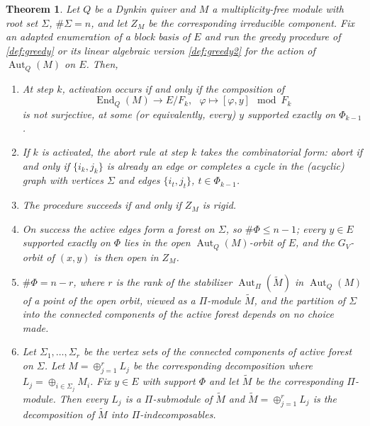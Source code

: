 \documentclass[12pt]{article}
\newtheorem{theorem}{Theorem}[section]
\newcommand{\End}{\operatorname{End}}
\newcommand{\Aut}{\operatorname{Aut}}
\begin{document}
\begin{theorem}\label{thm:quiver}
Let $Q$ be a Dynkin quiver and $M$ a multiplicity-free module with
root set $\Sigma$, $\#\Sigma=n$, and let $Z_M$ be the corresponding
irreducible component.  Fix an adapted enumeration of a block basis
of $E$ and run the greedy procedure of \cref{def:greedy} or its linear algebraic version
\cref{def:greedy2} for the action of $\Aut_Q(M)$ on $E$.  Then,
\begin{enumerate}
\item \label{part: quiveract} At step $k$, activation occurs if and only if the composition of
\[
\End_Q(M)\to E/F_k,\ \ \  \varphi\mapsto [\varphi,y]\mod F_k
\]
is not surjective, at some (or equivalently, every) $y$  supported exactly on $\Phi_{k-1}$.
\item \label{part: quiverabort} If $k$ is activated, the abort rule at step $k$ takes the combinatorial form: 
abort if and only if $\{i_k,j_k\}$ is already an edge or completes a cycle
in the (acyclic) graph with vertices $\Sigma$ and edges $\{i_t,j_t\}$, $t\in\Phi_{k-1}$.
\item \label{part: quiversucc} The procedure succeeds if and only if $Z_M$ is rigid.
\item \label{part: quiverforest} On success the active edges form a forest on $\Sigma$,
so $\#\Phi\le n-1$; every $y\in E$ supported exactly on $\Phi$ lies in the open
$\Aut_Q(M)$-orbit of $E$, and the $G_V$-orbit of $(x,y)$ is then
open in $Z_M$.
\item \label{part: quiverrank} $\#\Phi=n-r$, where $r$ is the rank of the stabilizer $\Aut_\Pi(\tilde M)$ in $\Aut_Q(M)$ of a point of the open orbit,
viewed as a $\Pi$-module $\tilde M$, and the partition of $\Sigma$ into the connected
components of the active forest depends on no choice made.
\item \label{part: quiverdecomp} Let $\Sigma_1,\dots,\Sigma_r$ be the vertex sets of the connected components of active forest on $\Sigma$.
Let $M=\oplus_{j=1}^r L_j$ be the corresponding decomposition where $L_j=\oplus_{i\in\Sigma_j}M_i$.
Fix $y\in E$ with support $\Phi$ and let $\tilde M$ be the corresponding $\Pi$-module.
Then every $L_j$ is a $\Pi$-submodule of $\tilde M$ and
$\tilde M=\oplus_{j=1}^r L_j$ is the decomposition of $\tilde M$ into $\Pi$-indecomposables.
\end{enumerate}
\end{theorem}
\end{document}

